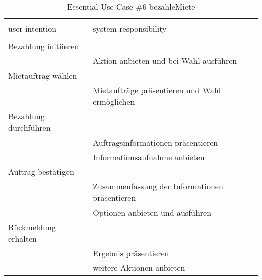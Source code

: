 \begin{table}[H]
\caption{Essential Use Case \#6 bezahleMiete }
\centering
\begin{tabular}{l l}
\\ [-0.5ex]

\hline\hline
\\ [-0.5ex]
user intention & system responsibility
\\ [1.5ex]
\hline
\\ [-0.5ex]
Bezahlung initiieren	 	& 											 \\[1ex]
							& Aktion anbieten und bei Wahl ausführen	 \\[1ex]
Mietauftrag wählen		  	& 											 \\[1ex] 
							& Mietaufträge präsentieren und Wahl ermöglichen \\[1ex]
Bezahlung durchführen		& 											 \\[1ex]
							& Auftragsinformationen präsentieren		 \\[1ex]
							& Informationsaufnahme anbieten	     		 \\[1ex]
Auftrag bestätigen			&	     									 \\[1ex]
							& Zusammenfassung der Informationen präsentieren \\[1ex]
							& Optionen anbieten	und ausführen			 \\[1ex]
Rückmeldung erhalten		& 		    		                         \\[1ex]
							& Ergebnis präsentieren		    		     \\[1ex]
							& weitere Aktionen anbieten	    		     \\[1ex]


\hline
\end{tabular}
\label{tab:statuscodes}
\end{table}

